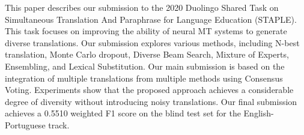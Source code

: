 This paper describes our submission to the 2020 Duolingo Shared Task on Simultaneous Translation And Paraphrase for Language Education (STAPLE). This task focuses on improving the ability of neural MT systems to generate diverse translations. Our submission explores various methods, including N-best translation, Monte Carlo dropout, Diverse Beam Search, Mixture of Experts, Ensembling, and Lexical Substitution. Our main submission is based on the integration of multiple translations from multiple methods using Consensus Voting. Experiments show that the proposed approach achieves a considerable degree of diversity without introducing noisy translations. Our final submission achieves a 0.5510 weighted F1 score on the blind test set for the English-Portuguese track.
